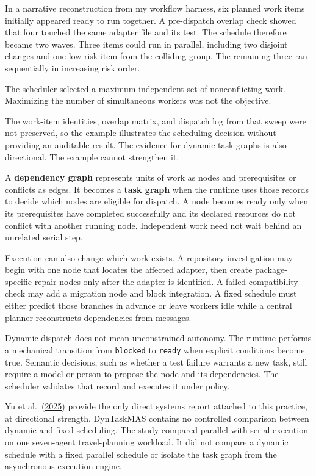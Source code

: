 In a narrative reconstruction from my workflow harness, six planned work items initially appeared ready to run together. A pre-dispatch overlap check showed that four touched the same adapter file and its test. The schedule therefore became two waves. Three items could run in parallel, including two disjoint changes and one low-risk item from the colliding group. The remaining three ran sequentially in increasing risk order.

The scheduler selected a maximum independent set of nonconflicting work. Maximizing the number of simultaneous workers was not the objective.

The work-item identities, overlap matrix, and dispatch log from that sweep were not preserved, so the example illustrates the scheduling decision without providing an auditable result. The evidence for dynamic task graphs is also directional. The example cannot strengthen it.

A \textbf{dependency graph} represents units of work as nodes and prerequisites or conflicts as edges. It becomes a \textbf{task graph} when the runtime uses those records to decide which nodes are eligible for dispatch. A node becomes ready only when its prerequisites have completed successfully and its declared resources do not conflict with another running node. Independent work need not wait behind an unrelated serial step.

Execution can also change which work exists. A repository investigation may begin with one node that locates the affected adapter, then create package-specific repair nodes only after the adapter is identified. A failed compatibility check may add a migration node and block integration. A fixed schedule must either predict those branches in advance or leave workers idle while a central planner reconstructs dependencies from messages.

Dynamic dispatch does not mean unconstrained autonomy. The runtime performs a mechanical transition from \texttt{blocked} to \texttt{ready} when explicit conditions become true. Semantic decisions, such as whether a test failure warrants a new task, still require a model or person to propose the node and its dependencies. The scheduler validates that record and executes it under policy.

Yu et al.~(\href{https://arxiv.org/abs/2503.07675}{2025}) provide the only direct systems report attached to this practice, at directional strength. DynTaskMAS contains no controlled comparison between dynamic and fixed scheduling. The study compared parallel with serial execution on one seven-agent travel-planning workload. It did not compare a dynamic schedule with a fixed parallel schedule or isolate the task graph from the asynchronous execution engine.

